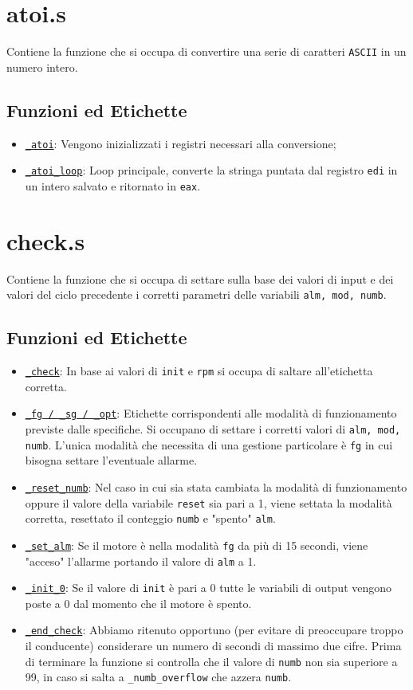 \documentclass[a4paper,11pt]{article}
\newcommand{\itemtt}[1]{\item \texttt{#1}}
\begin{document}
	
	\section{atoi.s}
	Contiene la funzione che si occupa di convertire una serie di caratteri \texttt{ASCII} in un numero intero. 
	\subsection{Funzioni ed Etichette}
	\begin{itemize}
		\itemtt{\hyperref[e:4:1]{\_atoi}}: Vengono inizializzati i registri necessari alla conversione;
		\itemtt{\hyperref[e:4:2]{\_atoi\_loop}}: Loop principale, converte la stringa puntata dal registro \texttt{edi} in un intero salvato e ritornato in \texttt{eax}. 
	\end{itemize}
	
	\section{check.s}
	Contiene la funzione che si occupa di settare sulla base dei valori di input e dei valori del ciclo precedente i corretti parametri delle variabili \texttt{alm, mod, numb}. 
	\subsection{Funzioni ed Etichette}
	\begin{itemize}
		\itemtt{\hyperref[e:5:1]{\_check}}: In base ai valori di \texttt{init} e \texttt{rpm} si occupa di saltare all'etichetta corretta. 
		\itemtt{\hyperref[e:5:2]{\_fg / \_sg / \_opt}}: Etichette corrispondenti alle modalità di funzionamento previste dalle specifiche. Si occupano di settare i corretti valori di \texttt{alm, mod, numb}. L'unica modalità che necessita di una gestione particolare è \texttt{fg} in cui bisogna settare l'eventuale allarme. 
		\itemtt{\hyperref[e:5:3]{\_reset\_numb}}: Nel caso in cui sia stata cambiata la modalità di funzionamento oppure il valore della variabile \texttt{reset} sia pari a 1, viene settata la modalità corretta, resettato il conteggio \texttt{numb} e "spento" \texttt{alm}.
		\itemtt{\hyperref[e:5:4]{\_set\_alm}}: Se il motore è nella modalità \texttt{fg} da più di 15 secondi, viene "acceso" l'allarme portando il valore di \texttt{alm} a 1.
		\itemtt{\hyperref[e:5:5]{\_init\_0}}: Se il valore di \texttt{init} è pari a 0 tutte le variabili di output vengono poste a 0 dal momento che il motore è spento. 
		\itemtt{\hyperref[e:5:6]{\_end\_check}}: Abbiamo ritenuto opportuno (per evitare di preoccupare troppo il conducente) considerare un numero di secondi di massimo due cifre. Prima di terminare la funzione si controlla che il valore di \texttt{numb} non sia superiore a 99, in caso si salta a \texttt{\_numb\_overflow} che azzera \texttt{numb}.
	\end{itemize}
	
\end{document}
